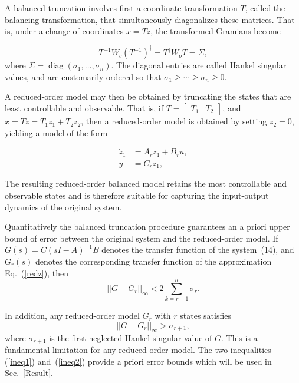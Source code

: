 \documentclass[12pt,lot, lof]{puthesis}
\begin{document}
A balanced truncation involves first a coordinate transformation $T$, called the balancing transformation, that simultaneously diagonalizes these matrices.  That is, under a change of coordinates $x=Tz$, the transformed Gramians become

\begin{equation}
T^{-1} W_c ( T^{-1} )^\dagger = T^{\dagger} W_o  T = \Sigma,
\end{equation}
where $\Sigma = \operatorname{diag}(\sigma_1,\ldots,\sigma_n)$.  The diagonal entries are called Hankel singular values, and are customarily ordered so that $\sigma_1 \ge \cdots \ge \sigma_n \ge 0$.

A reduced-order model may then be obtained by truncating the states that are least controllable and observable.  That is, if $T = \begin{bmatrix} T_1 & T_2\end{bmatrix}$, and $x = Tz = T_1 z_1 + T_2 z_2$, then a reduced-order model is obtained by setting $z_2=0$, yielding a model of the form

\begin{equation}
\label{redz}
\begin{aligned}
	\dot{z}_1 &= A_r z_1  + B_r u,   \\
	y &= C_r z_1 ,
\end{aligned}
\end{equation}

The resulting reduced-order balanced model retains the most controllable and observable states and is therefore suitable for capturing the input-output dynamics of the original system.

Quantitatively the balanced truncation procedure guarantees an a priori upper bound of error between the original system and the reduced-order model.  If $G(s)=C(sI-A)^{-1}B$ denotes the transfer function of the system~(14), and $G_r(s)$ denotes the corresponding transfer function of the approximation Eq.~(\ref{redz}), then 
\begin{equation}
\label{ineq1}
|| G - G_r||_{\infty} < 2 \sum_{k= r+1} ^n \sigma_r.
\end{equation}

In addition, any reduced-order model $G_r$ with $r$ states satisfies 
 \begin{equation}
 \label{ineq2}
|| G - G_r||_{\infty} > \sigma_{r+1},
\end{equation}
where $ \sigma_{r+1}$ is the first neglected Hankel singular value of $G$. This is a fundamental limitation for any reduced-order model. The two inequalities (\ref{ineq1}) and~(\ref{ineq2}) provide a priori error bounds which will be used in Sec.~\ref{Result}.
\end{document}

